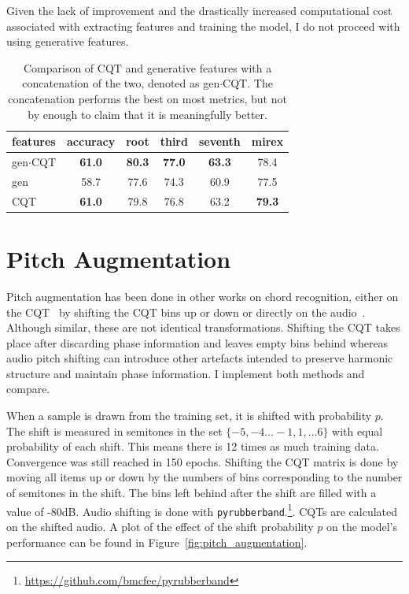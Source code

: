 Given the lack of improvement and the drastically increased computational cost associated with extracting features and training the model, I do not proceed with using generative features.

\begin{table}
    \centering
    \begin{tabular}{lccccc}
        \toprule
        features & accuracy & root  & third & seventh & mirex \\  
        \midrule
        gen$\cdot$CQT  & \textbf{61.0}     & \textbf{80.3}  & \textbf{77.0}  & \textbf{63.3}    & 78.4  \\
        gen      & 58.7     & 77.6  & 74.3  & 60.9    & 77.5  \\
        CQT      & \textbf{61.0}     & 79.8  & 76.8  & 63.2    & \textbf{79.3}  \\
        \bottomrule
    \end{tabular}
    \caption{Comparison of CQT and generative features with a concatenation of the two, denoted as gen$\cdot$CQT. The concatenation performs the best on most metrics, but not by enough to claim that it is meaningfully better. }\label{tab:gen_feature_comparison}
\end{table}

\section{Pitch Augmentation}\label{sec:pitch-augmentation}

Pitch augmentation has been done in other works on chord recognition, either on the CQT~\citep{ACRLargeVocab1} by shifting the CQT bins up or down or directly on the audio~\citep{BTC,StructuredTraining}. Although similar, these are not identical transformations. Shifting the CQT takes place after discarding phase information and leaves empty bins behind whereas audio pitch shifting can introduce other artefacts intended to preserve harmonic structure and maintain phase information. I implement both methods and compare.

When a sample is drawn from the training set, it is shifted with probability $p$. The shift is measured in semitones in the set $\{-5,-4\ldots -1, 1, \ldots 6\}$ with equal probability of each shift. This means there is 12 times as much training data. Convergence was still reached in 150 epochs. Shifting the CQT matrix is done by moving all items up or down by the numbers of bins corresponding to the number of semitones in the shift. The bins left behind after the shift are filled with a value of -80dB. Audio shifting is done with \texttt{pyrubberband}.\footnote{\url{https://github.com/bmcfee/pyrubberband}}. CQTs are calculated on the shifted audio. A plot of the effect of the shift probability $p$ on the model's performance can be found in Figure~\ref{fig:pitch_augmentation}.

